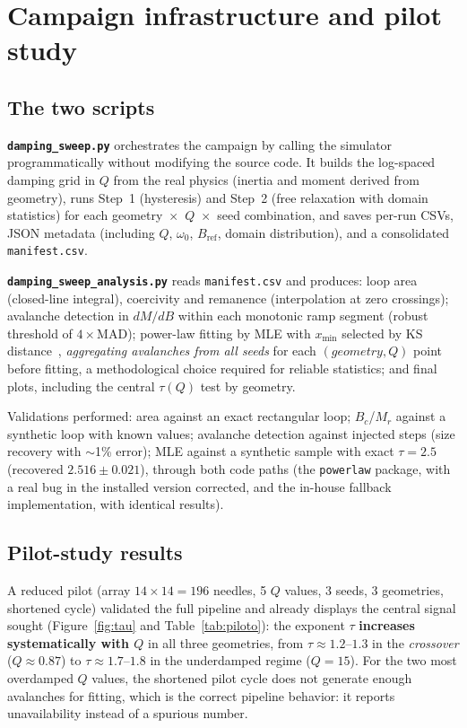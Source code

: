 \documentclass[11pt,a4paper]{article}
\newcommand{\code}[1]{\texttt{#1}}
\begin{document}
\section{Campaign infrastructure and pilot study}
\label{sec:campanha}

\subsection{The two scripts}

\textbf{\code{damping\_sweep.py}} orchestrates the campaign by calling the simulator programmatically without modifying the source code. It builds the log-spaced damping grid in $Q$ from the real physics (inertia and moment derived from geometry), runs Step~1 (hysteresis) and Step~2 (free relaxation with domain statistics) for each geometry~$\times$~$Q$~$\times$~seed combination, and saves per-run CSVs, JSON metadata (including $Q$, $\omega_0$, $B_{\mathrm{ref}}$, domain distribution), and a consolidated \code{manifest.csv}.

\textbf{\code{damping\_sweep\_analysis.py}} reads \code{manifest.csv} and produces: loop area (closed-line integral), coercivity and remanence (interpolation at zero crossings); avalanche detection in $dM/dB$ within each monotonic ramp segment (robust threshold of $4\times$MAD); power-law fitting by MLE with $x_{\min}$ selected by KS distance~\cite{clauset2009}, \emph{aggregating avalanches from all seeds} for each $(geometry, Q)$ point before fitting, a methodological choice required for reliable statistics; and final plots, including the central $\tau(Q)$ test by geometry.

Validations performed: area against an exact rectangular loop; $B_c$/$M_r$ against a synthetic loop with known values; avalanche detection against injected steps (size recovery with $\sim$1\% error); MLE against a synthetic sample with exact $\tau = 2.5$ (recovered $2.516 \pm 0.021$), through both code paths (the \code{powerlaw} package, with a real bug in the installed version corrected, and the in-house fallback implementation, with identical results).

\subsection{Pilot-study results}

A reduced pilot (array $14\times14 = 196$ needles, 5 $Q$ values, 3 seeds, 3 geometries, shortened cycle) validated the full pipeline and already displays the central signal sought (Figure~\ref{fig:tau} and Table~\ref{tab:piloto}): the exponent $\tau$ \textbf{increases systematically with $Q$} in all three geometries, from $\tau \approx 1.2$--$1.3$ in the \emph{crossover} ($Q \approx 0.87$) to $\tau \approx 1.7$--$1.8$ in the underdamped regime ($Q = 15$). For the two most overdamped $Q$ values, the shortened pilot cycle does not generate enough avalanches for fitting, which is the correct pipeline behavior: it reports unavailability instead of a spurious number.
\end{document}
